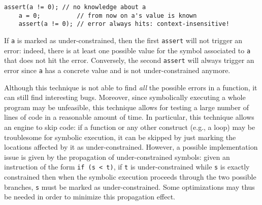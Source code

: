     \begin{lstlisting}[basicstyle=\ttfamily\small]
    assert(a != 0); // no knowledge about a
    a = 0;          // from now on a's value is known
    assert(a != 0); // error always hits: context-insensitive! 
    \end{lstlisting}

If {\tt a} is marked as under-constrained, then the first {\tt assert} will not trigger an error: indeed, there is at least one possible value for the symbol associated to {\tt a} that does not hit the error. Conversely, the second {\tt assert} will always trigger an error since {\tt a} has a concrete value and is not under-constrained anymore.

Although this technique is not able to find {\em all} the possible errors in a function, it can still find interesting bugs. Moreover, since symbolically executing a whole program may be unfeasible, this technique allows for testing a large number of lines of code in a reasonable amount of time. In particular, this technique allows an engine to skip code: if a function or any other construct (e.g., a loop) may be troublesome for symbolic execution, it can be skipped by just marking the locations affected by it as under-constrained. However, a possible implementation issue is given by the propagation of under-constrained symbols: given an instruction of the form {\tt if (s < t)}, if {\tt t} is under-constrained while {\tt s} is exactly constrained then when the symbolic execution proceeds through the two possible branches, {\tt s} must be marked as under-constrained. Some optimizations may thus be needed in order to minimize this propagation effect.
\fi

